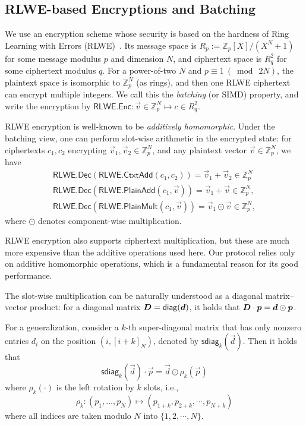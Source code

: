 \subsection{RLWE-based Encryptions and Batching}\label{sec:rlwe_and_batch}
We use an encryption scheme whose security is based on the hardness of Ring Learning with Errors (RLWE)~\cite{LPR10}. Its message space is $R_p := \mathbb{Z}_p[X]/(X^{N}+1)$ for some message modulus $p$ and dimension $N$, and ciphertext space is $R_q^2$ for some ciphertext modulus $q$.
For a power-of-two $N$ and $p \equiv 1~(\bmod~2N)$, the plaintext space is isomorphic to $\mathbb{Z}_p^{N}$ (as rings), and then one RLWE ciphertext can encrypt multiple integers. We call this the {\em batching} (or SIMD) property, and write the encryption by $\mathsf{RLWE.Enc}: \vec{v} \in \mathbb{Z}_p^N \mapsto c \in R_q^2.$

RLWE encryption is well-known to be {\em additively homomorphic}. Under the batching view, one can perform slot-wise arithmetic in the encrypted state: for ciphertexts $c_1,c_2$ encrypting $\vec{v}_1,\vec{v}_2 \in \mathbb{Z}_p^{N}$, and any plaintext vector $\vec{v}\in \mathbb{Z}_p^{N}$, we have
\begin{align*}
\mathsf{RLWE.Dec}\left(\mathsf{RLWE.CtxtAdd}(c_1,c_2)\right) =\vec{v}_1 + \vec{v}_2 \in \mathbb{Z}_p^{N} \\
  \mathsf{RLWE.Dec}\left(\mathsf{RLWE.PlainAdd}(c_1,\vec{v})\right) =\vec{v}_1 + \vec{v} \in \mathbb{Z}_p^{N}, 
\\  \mathsf{RLWE.Dec}\left(\mathsf{RLWE.PlainMult}(c_1, \vec{v})\right) =\vec{v}_1 \odot \vec{v} \in \mathbb{Z}_p^{N},
\end{align*}
where $\odot$ denotes component-wise multiplication.

\begin{remark}
RLWE encryption also supports ciphertext multiplication, but these are much more expensive than the additive operations used here. Our protocol relies only on additive homomorphic operations, which is a fundamental reason for its good performance.
\end{remark}

The slot-wise multiplication can be naturally understood as a diagonal matrix--vector product: for a diagonal matrix $\bm{D} = \mathsf{diag}(\bm{d})$, it holds that $\bm{D}\cdot \bm{p} = \bm{d} \odot \bm{p}$.

For a generalization, consider a $k$-th super-diagonal matrix that has only nonzero entries $d_i$ on the position $(i, [i+k]_N)$, denoted by $\mathsf{sdiag}_k(\vec d)$. Then it holds that
\[
  \mathsf{sdiag}_k(\vec d) \cdot \vec p = \vec d \odot \rho_k(\vec p)
\]
where $\rho_k(\cdot)$ is the left rotation by $k$ slots, i.e.,
\[
  \rho_k: (p_1, \dots, p_N) \mapsto (p_{1+k}, p_{2+k}, \cdots, p_{N+k})
\] 
where all indices are taken modulo $N$ into $\{1, 2, \cdots, N\}$.

